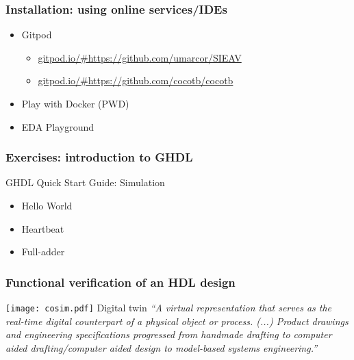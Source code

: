 \documentclass[xcolor={usenames,dvipsnames,svgnames}]{beamer}
\begin{document}
\begin{frame}
\frametitle{Installation: using online services/IDEs}
\vfill
\begin{itemize}
\item Gitpod \href{https://gitpod.io}{\faGlobe}
  \begin{itemize}
    \item \href{https://gitpod.io/\#https://github.com/umarcor/SIEAV}{gitpod.io/\#https://github.com/umarcor/SIEAV}
    \item \href{https://gitpod.io/\#https://github.com/cocotb/cocotb}{gitpod.io/\#https://github.com/cocotb/cocotb}
  \end{itemize}

\vfill

\item Play with Docker (PWD) \href{https://labs.play-with-docker.com/}{\faGlobe}

\vfill

\item EDA Playground \href{https://www.edaplayground.com/}{\faGlobe}

\end{itemize}
\vfill
\end{frame}

\begin{frame}
\frametitle{Exercises: introduction to GHDL}
\vfill
\begin{center}
GHDL Quick Start Guide: Simulation \href{https://ghdl.github.io/ghdl/quick_start/simulation}{\faBook}
\end{center}
\vfill
\begin{itemize}
  \item Hello World
  \href{https://ghdl.github.io/ghdl/quick_start/simulation/hello}{\faBook}

  \vfill

  \item Heartbeat
  \href{https://ghdl.github.io/ghdl/quick_start/simulation/heartbeat}{\faBook}

  \vfill

  \item Full-adder
  \href{https://ghdl.github.io/ghdl/quick_start/simulation/adder}{\faBook}
\end{itemize}
\vfill
\end{frame}

\begin{frame}
\frametitle{Functional verification of an HDL design}
\centering
\vfill
\texttt{[image: cosim.pdf]}
\vfill
Digital twin \href{https://en.wikipedia.org/wiki/Digital_twin}{\faWikipediaW}
\vfill
\emph{``A virtual representation that serves as the real-time digital counterpart of a physical object or process.
(...)
Product drawings and engineering specifications progressed from handmade drafting to computer aided drafting/computer aided design to model-based systems engineering.''}
\vfill
\end{frame}
\end{document}
